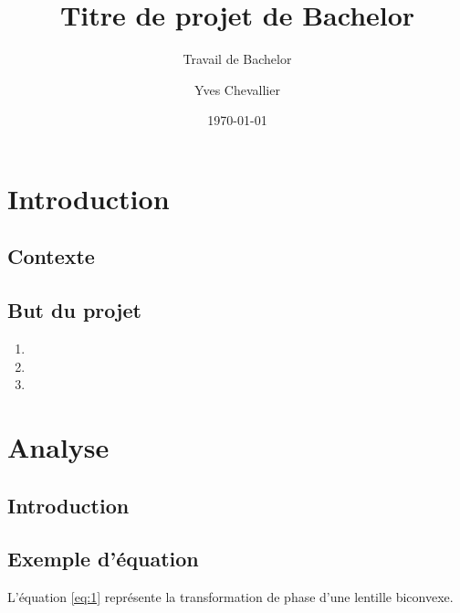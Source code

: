 \documentclass{heig-tb}
\date{\today} %
\author{Yves Chevallier} %
\institute{IAI}
\title{Titre de projet de Bachelor}
\subtitle{Travail de Bachelor}
\begin{document}
\maketitle
\frontmatter
\clearemptydoublepage

\preamble
\authentification

\begin{abstract}

\end{abstract}

\clearemptydoublepage

\tableofcontents
\listoffigures
\listoftables
\clearemptydoublepage
{}

\mainmatter
\chapter{Introduction}
\lipsum[3-4]

\section{Contexte}
\lipsum[5]

\section{But du projet}
\lipsum[7]

\begin{enumerate}
\item \lipsum[6][1]
\item \lipsum[6][2]
\item \lipsum[6][3]
\end{enumerate}

\chapter{Analyse}
\section{Introduction}

\lipsum[8]

\section{Exemple d'équation}
L'équation \ref{eq:1} représente la transformation de phase d'une lentille biconvexe.
\end{document}
